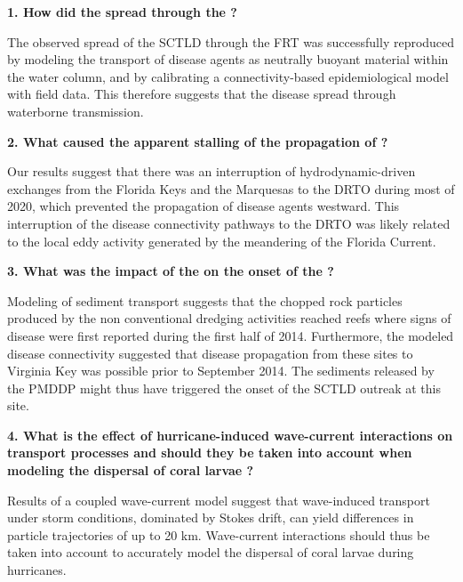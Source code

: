\begin{list}{}{%
    \setlength{\leftmargin}{0in}%
    }
    \item \textbf{1. How did the  spread through the  ?}
    \begin{list}{}{\setlength{\topsep}{0pt}}
        \item The observed spread of the SCTLD through the FRT was successfully reproduced by modeling the transport of disease agents as neutrally buoyant material within the water column, and by calibrating a connectivity-based epidemiological model with field data. This therefore suggests that the disease spread through waterborne transmission. 
    \end{list}
    \item \textbf{2. What caused the apparent stalling of the propagation of  ?}
    \begin{list}{}{\setlength{\topsep}{0pt}}
        \item Our results suggest that there was an interruption of hydrodynamic-driven exchanges from the Florida Keys and the Marquesas to the DRTO during most of 2020, which prevented the propagation of disease agents westward. This interruption of the disease connectivity pathways to the DRTO was likely related to the local eddy activity generated by the meandering of the Florida Current.
    \end{list}
    \item \textbf{3. What was the impact of the  on the onset of the ?}
    \begin{list}{}{\setlength{\topsep}{0pt}}
        \item Modeling of sediment transport suggests that the chopped rock particles produced by the non conventional dredging activities reached reefs where signs of disease were first reported during the first half of 2014. Furthermore, the modeled disease connectivity suggested that disease propagation from these sites to Virginia Key was possible prior to September 2014. The sediments released by the PMDDP might thus have triggered the onset of the SCTLD outreak at this site.
    \end{list}
    \item  \textbf{4. What is the effect of hurricane-induced wave-current interactions on transport processes and should they be taken into account when modeling the dispersal of coral larvae ?}
    \begin{list}{}{\setlength{\topsep}{0pt}}
        \item Results of a coupled wave-current model suggest that wave-induced transport under storm conditions, dominated by Stokes drift, can yield differences in particle trajectories of up to 20 km. Wave-current interactions should thus be taken into account to accurately model the dispersal of coral larvae during hurricanes.
    \end{list}
\end{list}

